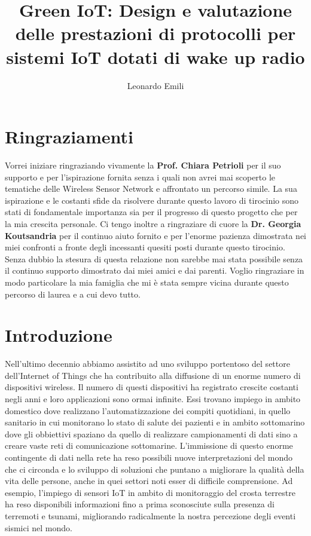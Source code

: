 \documentclass[binding=0.6cm,TFA]{sapthesis}
\title{Green IoT: Design e valutazione delle prestazioni di protocolli per sistemi IoT dotati di wake up radio}
\author{Leonardo Emili}
\begin{document}
\large

\frontmatter
\maketitle

\chapter*{Ringraziamenti}

Vorrei iniziare ringraziando vivamente la \textbf{Prof. Chiara Petrioli} per il suo supporto e per l'ispirazione fornita senza i quali non avrei mai scoperto
le tematiche delle Wireless Sensor Network e affrontato un percorso simile. La sua ispirazione e le costanti sfide da risolvere durante questo lavoro di tirocinio
sono stati di fondamentale importanza sia per il progresso di questo progetto che per la mia crescita personale. Ci tengo inoltre a ringraziare di cuore la
\textbf{Dr. Georgia Koutsandria} per il continuo aiuto fornito e per l'enorme pazienza dimostrata nei miei confronti a fronte degli incessanti quesiti posti
durante questo tirocinio.\\

Senza dubbio la stesura di questa relazione non sarebbe mai stata possibile senza il continuo supporto dimostrato dai miei amici e dai parenti. Voglio
ringraziare in modo particolare la mia famiglia che mi è stata sempre vicina durante questo percorso di laurea e a cui devo tutto.

\let\cleardoublepage    %
\clearpage
\let\cleardoublepage\clearpage  %

\tableofcontents

\mainmatter
\chapter{Introduzione}

Nell'ultimo decennio abbiamo assistito ad uno sviluppo portentoso del settore dell'Internet of Things che ha contribuito alla diffusione
di un enorme numero di dispositivi wireless. Il numero di questi dispositivi ha registrato crescite costanti negli anni e loro applicazioni sono ormai infinite.
Essi trovano impiego in ambito domestico dove realizzano l'automatizzazione dei compiti quotidiani, in quello sanitario in cui monitorano lo stato di salute
dei pazienti e in ambito sottomarino dove gli obbiettivi spaziano da quello di realizzare campionamenti di dati sino a creare vaste reti di comunicazione sottomarine.
L'immissione di questo enorme contingente di dati nella rete ha reso possibili nuove interpretazioni del mondo che ci circonda e lo sviluppo di soluzioni che puntano
a migliorare la qualità della vita delle persone, anche in quei settori noti esser di difficile comprensione. Ad esempio, l'impiego di sensori IoT in ambito di
monitoraggio del crosta terrestre ha reso disponibili informazioni fino a prima sconosciute sulla presenza di terremoti e tsunami, migliorando radicalmente
la nostra percezione degli eventi sismici nel mondo.\\
\end{document}
